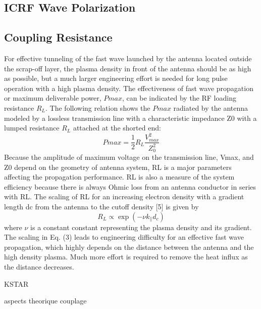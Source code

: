 \subsection{ICRF Wave Polarization}

\subsection{Coupling Resistance}
For effective tunneling of the fast wave launched
by the antenna located outside the scrap-off layer, the
plasma density in front of the antenna should be as high
as possible, but a much larger engineering effort is needed
for long pulse operation with a high plasma density. The
effectiveness of fast wave propagation or maximum deliverable
power, $Pmax$, can be indicated by the RF loading
resistance $R_L$. The following relation shows the $Pmax$ radiated
by the antenna modeled by a lossless transmission
line with a characteristic impedance Z0 with a lumped
resistance $R_L$ attached at the shorted end:
\begin{equation}
	Pmax = \frac{1}{2} R_L \frac{V^2_{max}}{Z_0^2}
\end{equation}
Because the amplitude of maximum voltage on the transmission
line, Vmax, and Z0 depend on the geometry of
antenna system, RL is a major parameters affecting the
propagation performance. RL is also a measure of the
system efficiency because there is always Ohmic loss from
an antenna conductor in series with RL.
The scaling of RL for an increasing electron density
with a gradient length dc from the antenna to the cutoff
density [5] is given by
\begin{equation}
	R_L \propto \exp\left(- \nu k_\parallel d_c \right)
\end{equation}
where $\nu$ is a constant constant representing the plasma density and
its gradient. The scaling in Eq. (3) leads to engineering
difficulty for an effective fast wave propagation, which
highly depends on the distance between the antenna and
the high density plasma. Much more effort is required
to remove the heat influx as the distance decreases.

KSTAR 

aspects theorique couplage

